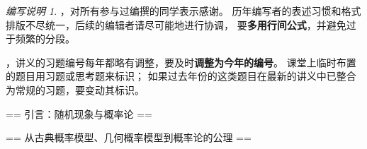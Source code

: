 \def\p{\mathbb{P}}
\def\e{\mathbb{E}}
\def\v{\mathbb{V}\mathrm{ar}\,}
\def\o{\omega}
\def\l{\,\big|\,}
\def\st{\text{ st }}
\def\dis{\displaystyle}
\def\and{\text{ and }}
\def\g{\operatorname{Geo}}
\def\G{\mathcal{G}}
\def\lm{\lim\limits_{n\to\infty}}
\def\ls{\varlimsup\limits_{n\to\infty}}
\def\li{\varliminf\limits_{n\to\infty}}
\newcommand{\cu}[1]{\bigcup\limits_{#1}^\infty}
\newcommand{\ca}[1]{\bigcap\limits_{#1}^\infty}
\newcommand{\sm}[1]{\sum\limits_{#1}^\infty}
\def\lf{\lfloor}\def\rf{\rfloor}
\theoremstyle{remark}\newtheorem*{foreword}{编写说明}

\begin{foreword}

，对所有参与过编撰的同学表示感谢。
历年编写者的表述习惯和格式排版不尽统一，后续的编辑者请尽可能地进行协调，
要\textbf{多用行间公式}，并避免过于频繁的分段。

，讲义的习题编号每年都略有调整，要及时\textbf{调整为今年的编号}。
课堂上临时布置的题目用$\boxed{习题}$或$\boxed{思考题}$来标识；
如果过去年份的这类题目在最新的讲义中已整合为常规的习题，要变动其标识。
\end{foreword}

== 引言：随机现象与概率论 ==

== 从古典概率模型、几何概率模型到概率论的公理 ==


